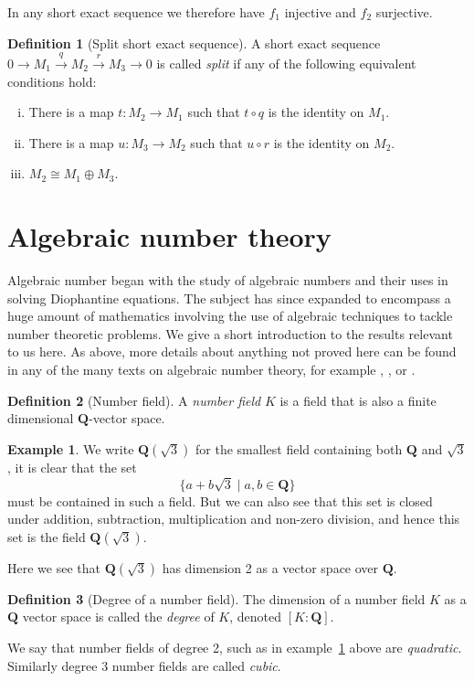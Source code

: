 \documentclass[12pt,a4paper,abstracton,bibtotoc]{scrreprt}
\theoremstyle{definition}
\newtheorem{defn}{Definition}
\newtheorem{ex}{Example}
\newcommand{\QQ}{\mathbf{Q}}
\begin{document}
In any short exact sequence we therefore have $f_1$ injective and $f_2$ surjective.

\begin{defn}[Split short exact sequence]
A short exact sequence $0 \to M_1 \xrightarrow{q} M_2 \xrightarrow{r} M_3 \to 0$ is called \emph{split} if any of the following equivalent conditions hold:
\begin{enumerate}[(i)]
\item There is a map $t\colon M_2 \to M_1$ such that $t\circ q$ is the identity on $M_1$.
\item There is a map $u\colon M_3 \to M_2$ such that $u\circ r$ is the identity on $M_2$.
\item $M_2 \cong M_1 \oplus M_3$.
\end{enumerate}
\end{defn}


\section{Algebraic number theory}
\label{sec:ant}

Algebraic number began with the study of algebraic numbers and their uses in solving Diophantine equations.
The subject has since expanded to encompass a huge amount of mathematics involving the use of algebraic techniques to tackle number theoretic problems.
We give a short introduction to the results relevant to us here.
As above, more details about anything not proved here can be found in any of the many texts on algebraic number theory, for example \cite{neukirch}, \cite{lang}, \cite{narkiewicz} or \cite{stewtall}.

\begin{defn}[Number field]
A \emph{number field} $K$ is a field that is also a finite dimensional $\QQ$-vector space.
\end{defn}

\begin{ex}\label{ex:quad}
We write $\QQ(\sqrt{3})$ for the smallest field containing both $\QQ$ and $\sqrt{3}$, it is clear that the set
\[
\{a + b\sqrt{3}\mid a,b \in \QQ\}
\]
must be contained in such a field.
But we can also see that this set is closed under addition, subtraction, multiplication and non-zero division, and hence this set is the field $\QQ(\sqrt{3})$.

Here we see that $\QQ(\sqrt{3})$ has dimension 2 as a vector space over $\QQ$.
\end{ex}

\begin{defn}[Degree of a number field]
The dimension of a number field $K$ as a $\QQ$ vector space is called the \emph{degree} of $K$, denoted $[K:\QQ]$.

We say that number fields of degree 2, such as in example~\ref{ex:quad} above are \emph{quadratic}.
Similarly degree 3 number fields are called \emph{cubic}.
\end{defn}
\end{document}
